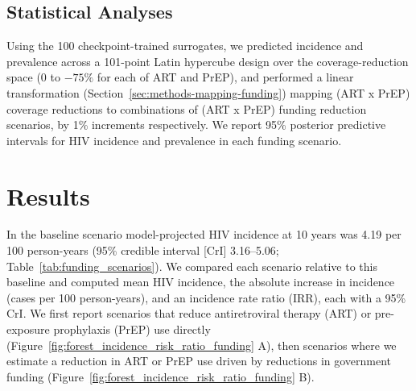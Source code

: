 \documentclass[preprint,12pt]{elsarticle}
\begin{document}


\subsection{Statistical Analyses}
\label{sec:methods-stat-analyses}
Using the 100 checkpoint-trained surrogates, we predicted incidence and prevalence across a 101-point Latin hypercube design over the coverage-reduction space (0 to $-75\%$ for each of ART and PrEP), and performed a linear transformation (Section~\ref{sec:methods-mapping-funding}) mapping (ART x PrEP) coverage reductions to combinations of (ART x PrEP) funding reduction scenarios, by 1\% increments respectively. We report 95\% posterior predictive intervals for HIV incidence and prevalence in each funding scenario.

\section{Results}
\label{sec:results}

In the baseline scenario model-projected HIV incidence at 10 years was 4.19 per 100 person-years (95\% credible interval [CrI] 3.16--5.06; Table~\ref{tab:funding_scenarios}). We compared each scenario relative to this baseline and computed mean HIV incidence, the absolute increase in incidence (cases per 100 person-years), and an incidence rate ratio (IRR), each with a 95\% CrI. We first report scenarios that reduce antiretroviral therapy (ART) or pre-exposure prophylaxis (PrEP) use directly (Figure~\ref{fig:forest_incidence_risk_ratio_funding} A), then scenarios where we estimate a reduction in ART or PrEP use driven by reductions in government funding (Figure~\ref{fig:forest_incidence_risk_ratio_funding} B).
\end{document}
